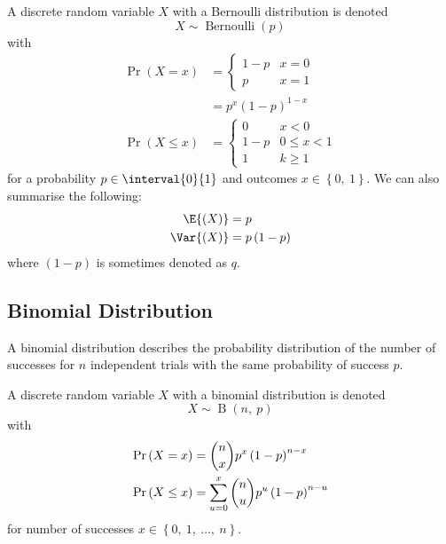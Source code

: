 \documentclass{article}
\begin{document}
\begin{multicols}{3}
    A discrete random variable \(X\) with a Bernoulli distribution is denoted
    \begin{equation*}
        X \sim \operatorname{Bernoulli}{\left( p \right)}
    \end{equation*}
    with
    \begin{align*}
        \Pr{\left( X = x \right)}    & = \begin{cases}
                                             1 - p & x = 0 \\
                                             p     & x = 1
                                         \end{cases}                    \\
                                     & = p^x \left( 1 - p \right)^{1 - x} \\
        \Pr{\left( X \leq x \right)} & = \begin{cases}
                                             0     & x < 0        \\
                                             1 - p & 0 \leq x < 1 \\
                                             1     & k \geq 1
                                         \end{cases}
    \end{align*}
    for a probability \(p \in \interval{0}{1}\) and outcomes \(x \in \left\{ 0,\: 1 \right\}\).
    We can also summarise the following:
    \begin{align*}
        \E{\left( X \right)}   & = p                      \\
        \Var{\left( X \right)} & = p \left( 1 - p \right)
    \end{align*}
    where \(\left( 1 - p \right)\) is sometimes denoted as \(q\).
    \subsection{Binomial Distribution}
    A binomial distribution describes the probability distribution of the number of successes
    for \(n\) independent trials with the same probability of success \(p\).

    A discrete random variable \(X\) with a binomial distribution is denoted
    \begin{equation*}
        X \sim \operatorname{B}{\left( n,\: p \right)}
    \end{equation*}
    with
    \begin{align*}
        \Pr{\left( X = x \right)}    & = \dbinom{n}{x} p^x \left( 1 - p \right)^{n - x}                \\
        \Pr{\left( X \leq x \right)} & = \sum_{u = 0}^x \dbinom{n}{u} p^u \left( 1 - p \right)^{n - u}
    \end{align*}
    for number of successes \(x \in \left\{ 0,\: 1,\: \dots,\: n \right\}\).


\end{multicols}
\end{document}
